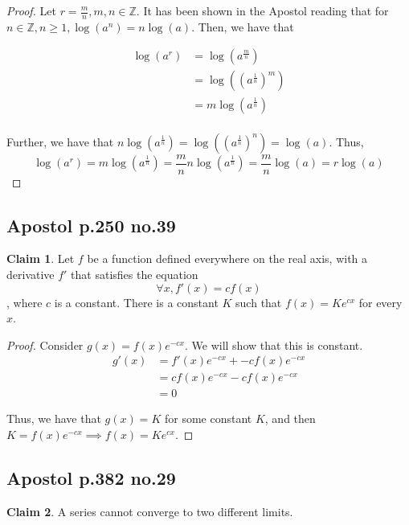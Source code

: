 \documentclass[12pt,letterpaper]{article}
\theoremstyle{definition}
\newtheorem*{claim}{Claim}
\newcommand{\Z}{\mathbb{Z}}
\begin{document}
\begin{proof}
  Let $r = \frac{m}{n}, m,n \in \Z$. It has been shown in the Apostol reading
  that for $n \in \Z, n \geq 1, \log(a^n) = n\log(a)$. Then, we have that 

  \begin{align*}
    \log(a^r) &= \log(a^{\frac{m}{n}}) \\
              &= \log((a^{\frac{1}{n}})^m) \\
              &= m\log(a^{\frac{1}{n}}) \\
  \end{align*}

  Further, we have that $n\log(a^{\frac{1}{n}}) = \log((a^{\frac{1}{n}})^n) = \log(a)$.
  Thus,
  \[
    \log(a^r) = m\log(a^{\frac{1}{n}}) = \frac{m}{n}n\log(a^{\frac{1}{n}}) =
    \frac{m}{n}\log(a) = r\log(a)
  \]
\end{proof}

\subsection*{Apostol p.250 no.39}

\begin{claim}
  Let $f$ be a function defined everywhere on the real axis, with a derivative
  $f'$ that satisfies the equation
  \[ \forall x, f'(x) = cf(x) \],
  where $c$ is a constant. There is a constant $K$ such that $f(x) = Ke^{cx}$
  for every $x$.
\end{claim}

\begin{proof}
  Consider $g(x) = f(x)e^{-cx}$. We will show that this is constant.
  \begin{align*}
    g'(x) &= f'(x)e^{-cx} + -cf(x)e^{-cx} \\
          &= cf(x)e^{-cx} - cf(x)e^{-cx} \\
          &= 0
  \end{align*}

  Thus, we have that $g(x) = K$ for some constant $K$, and then $K = f(x)e^{-cx}
  \implies f(x) = Ke^{cx}$.
\end{proof}

\subsection*{Apostol p.382 no.29}

\begin{claim}
  A series cannot converge to two different limits.
\end{claim}
\end{document}
